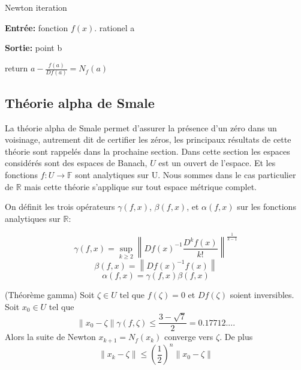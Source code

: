 \documentclass[a4paper,10.5pt]{article}
\begin{document}
	\begin{algorithm}
		\caption{Newton iteration}
		
		\vspace{2mm}
		
		\textbf{Entrée:} fonction $f(x)$. rationel a
		
		\textbf{Sortie:} point b
		
		\begin{algorithmic}[1]
			
			\STATE return $a-\frac{f(a)}{Df(a)}=N_{f}(a)$
		\end{algorithmic}
	\end{algorithm}

	\subsection{Théorie alpha de Smale}
	La théorie alpha de Smale permet d'assurer la présence d'un zéro dans un voisinage, autrement dit de certifier les zéros, les principaux résultats de cette théorie sont rappelés dans la prochaine section.
	Dans cette section les espaces considérés sont des espaces de Banach, $U$ est un ouvert de l'espace. Et les fonctions $f:U\rightarrow \mathbb{F}$ sont analytiques sur U. Nous sommes dans le cas particulier de $\mathbb{R}$ mais cette théorie s'applique sur tout espace métrique complet. 
	
	\begin{definition}
		
		On définit les trois opérateurs $\gamma(f,x)$, $\beta(f,x)$, et $\alpha(f,x)$ sur les fonctions analytiques sur $\mathbb{R}$:
		
		\[\gamma(f,x)=\sup_{k \geq 2}\left\|Df(x)^{-1}\frac{D^{k}f(x)}{k!}\right\|^{\frac{1}{k-1}}\]
		\[\beta(f,x)=\left\|Df(x)^{-1}f(x)\right\|\]
		\[\alpha(f,x)=\gamma(f,x)\beta(f,x)\]
	\end{definition}
	
	\begin{theorem}(Théorème gamma) Soit $\zeta \in U$ tel que $f(\zeta)=0$ et $Df(\zeta)$ soient inversibles. Soit $x_{0} \in U$ tel que \\
		\[\left\|x_{0}-\zeta\right\|\gamma(f,\zeta) \leq \frac{3-\sqrt{7}}{2}=0.17712.... \]
		Alors la suite de Newton $x_{k+1}=N_{f}(x_{k})$ converge vers $\zeta$. De plus\\
		\[\left\|x_{k}-\zeta\right\| \leq \left(\frac{1}{2}\right)^{n}\left\|x_{0}-\zeta\right\|\]
	\end{theorem}
	
\end{document}
